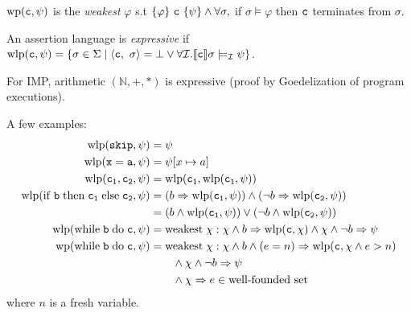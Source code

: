 \begin{definition} $\mathrm{wp}(\mathtt{c}, \psi)$ is the \textit{weakest} $\varphi$ s.t $\{\varphi\} ~\mathtt{c}~ \{\psi\} \land \forall \sigma,$ if $\sigma \models \varphi$ then $\mathtt{c}$ terminates from $\sigma$.
\end{definition}

\begin{definition}
    An assertion language is \emph{expressive} if $\mathrm{wlp}(\mathtt{c},\psi) = \{\sigma \in \Sigma \mid \langle \mathtt{c},~\sigma \rangle = \bot \lor \forall \mathcal{I}. \llbracket \mathtt{c} \rrbracket{\sigma} \models_{\mathcal{I}}\psi\}$.
\end{definition}

\begin{remark}
    For IMP, arithmetic $(\mathbb{N}, +, *)$ is expressive (proof by Goedelization of program executions).
\end{remark}


\begin{example} 
A few examples:
\begin{align*}
    \mathrm{wlp}(\mathtt{skip}, \psi) &= \psi\\
    \mathrm{wlp}(\mathtt{x=a}, \psi) &= \psi[x\mapsto a]\\
    \mathrm{wlp}(\mathtt{c_1}, \mathtt{c_2}, \psi) &= \mathrm{wlp}(\mathtt{c_1}, \mathrm{wlp}(\mathtt{c_1}, \psi)) \\
    \mathrm{wlp}(\mathtt{\mathrm{if}\;b\;\mathrm{then}\;c_1\;\mathrm{else}\;c_2}, \psi) &= (b\Rightarrow \mathrm{wlp}(\mathtt{c_1}, \psi)) \land (\neg b \Rightarrow \mathrm{wlp}(\mathtt{c_2}, \psi))\\
    &= (b \land \mathrm{wlp}(\mathtt{c_1}, \psi)) \lor (\neg b \land \mathrm{wlp}(\mathtt{c_2}, \psi)) \\
    \mathrm{wlp}(\mathtt{\mathrm{while}\;b\;\mathrm{do}\;c}, \psi)  &= \text{weakest} \; \chi:
    \chi \land b \Rightarrow \mathrm{wlp}(\mathtt{c}, \chi) \land \chi \land \neg b \Rightarrow \psi \\
    \mathrm{wp}(\mathtt{\mathrm{while}\;b\;\mathrm{do}\;c}, \psi)  &= \text{weakest} \; \chi:
    \chi \land b \land (e=n) \Rightarrow \mathrm{wlp}(\mathtt{c}, \chi\land e>n) \\
    &\quad\quad  \land \chi \land \neg b \Rightarrow \psi \\
    &\quad \quad \land \chi\Rightarrow  e \in \text{well-founded set}
\end{align*}
where $n$ is a fresh variable. 
\end{example}


